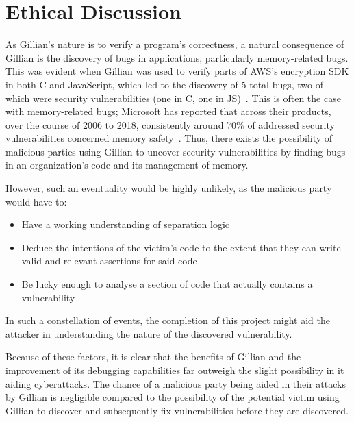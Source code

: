 
\chapter{Ethical Discussion}\label{sec:ethics}

As Gillian's nature is to verify a program's correctness, a natural consequence
of Gillian is the discovery of bugs in applications, particularly memory-related
bugs. This was evident when Gillian was used to verify parts of AWS's encryption
SDK in both C and JavaScript, which led to the discovery of 5 total bugs, two of
which were security vulnerabilities (one in C, one in JS)~\cite{gillian-part2}.
This is often the case with memory-related bugs; Microsoft has reported that
across their products, over the course of 2006 to 2018, consistently around 70\%
of addressed security vulnerabilities concerned memory
safety~\cite{microsoft-memory-bugs}.
Thus, there exists the possibility of malicious parties using Gillian to uncover
security vulnerabilities by finding bugs in an organization's code and its
management of memory.

However, such an eventuality would be highly unlikely, as the malicious party
would have to:
\begin{itemize}
  \item Have a working understanding of separation logic
  \item Deduce the intentions of the victim's code to the extent that they can
        write valid and relevant assertions for said code
  \item Be lucky enough to analyse a section of code that actually contains a
        vulnerability
\end{itemize}

In such a constellation of events, the completion of this project might aid the
attacker in understanding the nature of the discovered vulnerability.

Because of these factors, it is clear that the benefits of Gillian and the
improvement of its debugging capabilities far outweigh the slight possibility in
it aiding cyberattacks. The chance of a malicious party being aided in their
attacks by Gillian is negligible compared to the possibility of the potential
victim using Gillian to discover and subsequently fix vulnerabilities before
they are discovered.
